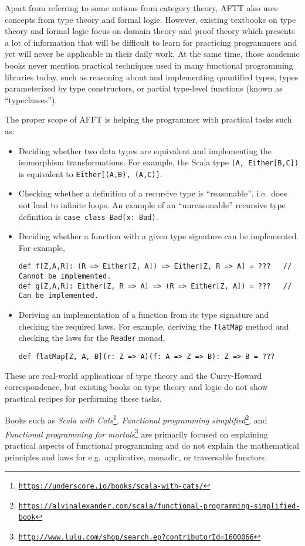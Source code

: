 Apart from referring to some notions from category theory, AFTT also
uses concepts from type theory and formal logic. However, existing
textbooks on type theory and formal logic focus on domain theory and
proof theory \textemdash{} which presents a lot of information that
will be difficult to learn for practicing programmers and yet will
never be applicable in their daily work. At the same time, those academic
books never mention practical techniques used in many functional programming
libraries today, such as reasoning about and implementing quantified
types, types parameterized by type constructors, or partial type-level
functions (known as ``typeclasses'').

The proper scope of AFFT is helping the programmer with practical
tasks such as:
\begin{itemize}
\item Deciding whether two data types are equivalent and implementing the
isomorphism transformations. For example, the Scala type \lstinline!(A, Either[B,C])!
is equivalent to \lstinline!Either[(A,B), (A,C)]!.
\item Checking whether a definition of a recursive type is ``reasonable'',
i.e.~does not lead to infinite loops. An example of an ``unreasonable''
recursive type definition is \lstinline!case class Bad(x: Bad)!.
\item Deciding whether a function with a given type signature can be implemented.
For example, 
\begin{lstlisting}
def f[Z,A,R]: (R => Either[Z, A]) => Either[Z, R => A] = ???   // Cannot be implemented.
def g[Z,A,R]: Either[Z, R => A] => (R => Either[Z, A]) = ???   // Can be implemented.
\end{lstlisting}
\item Deriving an implementation of a function from its type signature and
checking the required laws. For example, deriving the \lstinline!flatMap!
method and checking the laws for the \lstinline!Reader! monad,
\begin{lstlisting}
def flatMap[Z, A, B](r: Z => A)(f: A => Z => B): Z => B = ???
\end{lstlisting}
\end{itemize}
These are real-world applications of type theory and the Curry-Howard
correspondence, but existing books on type theory and logic do not
show practical recipes for performing these tasks.

Books such as \emph{Scala with Cats}\footnote{\texttt{\href{https://underscore.io/books/scala-with-cats/}{https://underscore.io/books/scala-with-cats/}}},
\emph{Functional programming simplified}\footnote{\texttt{\href{https://alvinalexander.com/scala/functional-programming-simplified-book}{https://alvinalexander.com/scala/functional-programming-simplified-book}}},
and \emph{Functional programming for mortals}\footnote{\texttt{\href{http://www.lulu.com/shop/search.ep?contributorId=1600066}{http://www.lulu.com/shop/search.ep?contributorId=1600066}}}
are primarily focused on explaining practical aspects of functional
programming and do not explain the mathematical principles and laws
for e.g.~applicative, monadic, or traversable functors.

